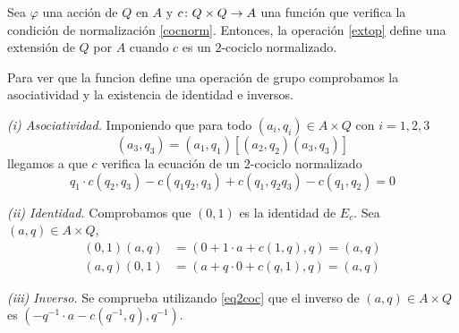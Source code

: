 \begin{proposicion}\label{prop:res1}
Sea $\varphi$ una acción de $Q$ en $A$ y $c\colon Q\times Q\to A$ una función que verifica la condición de normalización \eqref{cocnorm}. Entonces, la operación \eqref{extop} define una extensión de $Q$ por $A$ cuando $c$ es un $2$-cociclo normalizado.
	\begin{demostracion}
	Para ver que la funcion define una operación de grupo comprobamos la asociatividad y la existencia de identidad e inversos.
	
	

	\textit{(i) Asociatividad.}
	Imponiendo que para todo $(a_i,q_i)\in A\times Q$ con $i=1,2,3$
	\begin{equation*}
		[(a_1,q_1)(a_2,q_2)](a_3,q_3) = (a_1,q_1)[(a_2,q_2)(a_3,q_3)]
	\end{equation*} 
	llegamos a que $c$ verifica la ecuación de un $2$-cociclo normalizado	
	\begin{equation}\label{eq2coc}	
		 q_1\cdot c(q_2,q_3) - c(q_1q_2,q_3) + c(q_1,q_2q_3) - c(q_1,q_2) = 0
	\end{equation}
	
	\textit{(ii) Identidad.} Comprobamos que $(0,1)$ es la identidad de $E_c$. 
	Sea $(a,q)\in A\times Q$,
	\begin{align*}
		(0,1)(a,q) &= (0 + 1\cdot a + c(1,q), q) = (a,q) \\
		(a,q)(0,1) &= (a+q\cdot 0 + c(q,1),q) = (a,q)
	\end{align*}
	
	\textit{(iii) Inverso.} Se comprueba utilizando \eqref{eq2coc} que el inverso de $(a,q)\in A\times Q$ es $(-q^{-1}\cdot a -c(q^{-1},q),q^{-1})$.
	

\end{demostracion}
\end{proposicion}
